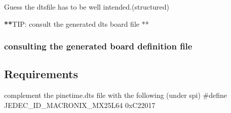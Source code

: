 \documentclass[letterpaper,10pt,english]{sphinxmanual}
\begin{document}
Guess the dts\sphinxhyphen{}file has to be well intended.(structured)

{\color{red}\bfseries{}**}TIP: consult the generated dts board file **


\subsubsection{consulting the generated board definition file}
\label{\detokenize{drivers/spinor:consulting-the-generated-board-definition-file}}
\begin{sphinxVerbatim}[commandchars=\\\{\}]
\end{sphinxVerbatim}


\subsection{Requirements}
\label{\detokenize{drivers/spinor:requirements}}
complement the pinetime.dts file with the following (under spi)
\#define JEDEC\_ID\_MACRONIX\_MX25L64      0xC22017
\end{document}
